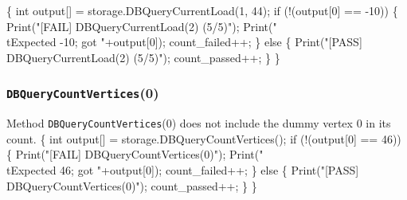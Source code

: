 \documentclass{article}
\def\nwendcode{\endtrivlist \endgroup}
\let\nwdocspar=\par
\theoremstyle{definition}
\begin{document}
\nwenddocs{}\endmoddef{}
\{
  int output[] = storage.DBQueryCurrentLoad(1, 44);
  if (!(output[0] == -10)) \{
    Print("[FAIL] DBQueryCurrentLoad(2) (5/5)");
    Print("\\tExpected -10; got "+output[0]);
    count_failed++;
  \} else \{
    Print("[PASS] DBQueryCurrentLoad(2) (5/5)");
    count_passed++;
  \}
\}
\nwendcode{}\nwdocspar
\subsubsection{{\tt{}DBQueryCountVertices}(0)}
Method {\tt{}DBQueryCountVertices}(0) does not include the dummy vertex 0 in its
count.
\nwenddocs{}\endmoddef{}
\{
  int output[] = storage.DBQueryCountVertices();
  if (!(output[0] == 46)) \{
    Print("[FAIL] DBQueryCountVertices(0)");
    Print("\\tExpected 46; got "+output[0]);
    count_failed++;
  \} else \{
    Print("[PASS] DBQueryCountVertices(0)");
    count_passed++;
  \}
\}
\nwendcode{}\nwdocspar
\end{document}
